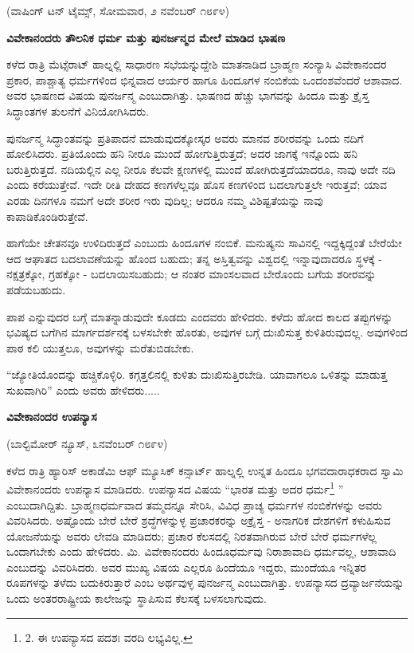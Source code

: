 \begin{center}
(ವಾಷಿಂಗ್ ಟನ್ ಟೈಮ್ಸ್, ಸೋಮವಾರ, ೨ ನವೆಂಬರ್ ೧೮೯೪)
\end{center}

\begin{center}
\textbf{ವಿವೇಕಾನಂದರು ತೌಲನಿಕ ಧರ್ಮ ಮತ್ತು ಪುನರ್ಜನ್ಮದ ಮೇಲೆ ಮಾಡಿದ ಭಾಷಣ}
\end{center}

ಕಳೆದ ರಾತ್ರಿ ಮೆಟ್ಸೆರಾಟ್ ಹಾಲ್ನಲ್ಲಿ ಸಾಧಾರಣ ಸಭೆಯನ್ನುದ್ದೇಶಿ ಮಾತನಾಡಿದ ಬ್ರಾಹ್ಮಣ ಸಂನ್ಯಾಸಿ ವಿವೇಕಾನಂದರ ಪ್ರಕಾರ, ಪಾಶ್ಚಾತ್ಯ ಧರ್ಮಗಳಿಂದ ಭಿನ್ನವಾದ ಆರ್ಯರ ಹಾಗೂ ಹಿಂದೂಗಳ ನಂಬಿಕೆಯ ಒಂದಂಶವೆಂದರೆ ಆಶಾವಾದ. ಅವರ ಭಾಷಣದ ವಿಷಯ ಪುನರ್ಜನ್ಮ ಎಂಬುದಾಗಿತ್ತು. ಭಾಷಣದ ಹೆಚ್ಚು ಭಾಗವನ್ನು ಹಿಂದೂ ಮತ್ತು ಕ್ರೈಸ್ತ ಸಿದ್ಧಾಂತಗಳ ತುಲನೆಗೆ ವಿನಿಯೋಗಿಸಿದರು.

ಪುನರ್ಜನ್ಮ ಸಿದ್ಧಾಂತವನ್ನು ಪ್ರತಿಪಾದನೆ ಮಾಡುವುದಕ್ಕೋಸ್ಕರ ಅವರು ಮಾನವ ಶರೀರವನ್ನು ಒಂದು ನದಿಗೆ ಹೋಲಿಸಿದರು. ಪ್ರತಿಯೊಂದು ಹನಿ ನೀರೂ ಮುಂದೆ ಹೋಗುತ್ತಿರುತ್ತದೆ; ಅದರ ಜಾಗಕ್ಕೆ ಇನ್ನೊಂದು ಹನಿ ಬರುತ್ತಿರುತ್ತದೆ. ನದಿಯಲ್ಲಿನ ಎಲ್ಲ ನೀರೂ ಕೆಲವೇ ಕ್ಷಣಗಳಲ್ಲಿ ಮುಂದೆ ಹೋಗಿರುತ್ತದೆಯಾದರೂ, ನಾವು ಅದೇ ನದಿ ಎಂದು ಕರೆಯುತ್ತೇವೆ. ಇದೇ ರೀತಿ ದೇಹದ ಕಣಗಳೆಲ್ಲವೂ ಹೊಸ ಕಣಗಳಿಂದ ಬದಲಾಗುತ್ತಲೇ ಇರುತ್ತವೆ; ಯಾವ ಎರಡು ದಿನಗಳೂ ನಮಗೆ ಅದೇ ಶರೀರ ಇರು ವುದಿಲ್ಲ; ಆದರೂ ನಮ್ಮ ವಿಶಿಷ್ಟತೆಯನ್ನು ನಾವು ಕಾಪಾಡಿಕೊಂಡಿರುತ್ತೇವೆ.

ಹಾಗೆಯೇ ಚೇತನವೂ ಉಳಿದಿರುತ್ತದೆ ಎಂಬುದು ಹಿಂದೂಗಳ ನಂಬಿಕೆ. ಮನುಷ್ಯನು ಸಾವಿನಲ್ಲಿ ಇದ್ದಕ್ಕಿದ್ದಂತೆ ಬೇರೆಯೇ ಆದ ಆಘಾತದ ಬದಲಾವಣೆಯನ್ನು ಹೊಂದ ಬಹುದು; ತನ್ನ ಅಸ್ತಿತ್ವವನ್ನು ವಿಶ್ವದಲ್ಲಿ ಇನ್ನಾವುದಾದರೂ ಸ್ಥಳಕ್ಕೆ - ನಕ್ಷತ್ರಕ್ಕೋ, ಗ್ರಹಕ್ಕೋ - ಬದಲಾಯಿಸಬಹುದು; ಆ ನಂತರ ಮಾಂಸಲವಾದ ಬೇರೊಂದು ಬಗೆಯ ಶರೀರವನ್ನು ಪಡೆಯಬಹುದು.

ಪಾಪ ಎನ್ನುವುದರ ಬಗ್ಗೆ ಮಾತನ್ನಾಡುವುದೇ ಕೂಡದು ಎಂದವರು ಹೇಳಿದರು. ಕಳೆದು ಹೋದ ಕಾಲದ ತಪ್ಪುಗಳನ್ನು ಭವಿಷ್ಯದ ಬಗೆಗಿನ ಮಾರ್ಗದರ್ಶನಕ್ಕೆ ಬಳಸಬೇಕೇ ಹೊರತು, ಅವುಗಳ ಬಗ್ಗೆ ದುಃಖಿಸುತ್ತ ಕುಳಿತಿರುವುದಲ್ಲ. ಅವುಗಳಿಂದ ಪಾಠ ಕಲಿ ಯುತ್ತಲೂ, ಅವುಗಳನ್ನು ಮರೆತುಬಿಡಬೇಕು.

“ಜ್ಯೋತಿಯೊಂದನ್ನು ಹಚ್ಚಿಕೊಳ್ಳಿರಿ. ಕಗ್ಗತ್ತಲಿನಲ್ಲಿ ಕುಳಿತು ದುಃಖಿಸುತ್ತಿರಬೇಡಿ. ಯಾವಾಗಲೂ ಒಳಿತನ್ನು ಮಾಡುತ್ತ ಸುಖವಾಗಿರಿ” ಎಂದು ಅವರು ಹೇಳಿದರು.....

\begin{center}
\textbf{ವಿವೇಕಾನಂದರ ಉಪನ್ಯಾಸ}
\end{center}

\begin{center}
(ಬಾಲ್ಟಿಮೋರ್ ನ್ಯೂಸ್, ೩ನವೆಂಬರ್ ೧೮೯೪)
\end{center}

ಕಳೆದ ರಾತ್ರಿ ಹ್ಯಾರಿಸ್ ಅಕಾಡೆಮಿ ಆಫ್ ಮ್ಯೂಸಿಕ್ ಕನ್ಸಾರ್ಟ್ ಹಾಲ್ನಲ್ಲಿ ಉನ್ನತ ಹಿಂದೂ ಭಗವದಾರಾಧಕರಾದ ಸ್ವಾಮಿ ವಿವೇಕಾನಂದರು ಉಪನ್ಯಾಸ ಮಾಡಿದರು. ಉಪನ್ಯಾಸದ ವಿಷಯ “ಭಾರತ ಮತ್ತು ಅದರ ಧರ್ಮ\footnote{2. ಈ ಉಪನ್ಯಾಸದ ಪದಶಃ ವರದಿ ಲಭ್ಯವಿಲ್ಲ.} ” ಎಂಬುದಾಗಿದ್ದಿತು. ಬ್ರಾಹ್ಮಣಧರ್ಮವಾದ ತಮ್ಮದನ್ನೂ ಸೇರಿಸಿ, ವಿವಿಧ ಪ್ರಾಚ್ಯ ಧರ್ಮಗಳ ನಂಬಿಕೆಗಳನ್ನು ಅವರು ವಿವರಿಸಿದರು. ಅಷ್ಟೊಂದು ಬೇರೆ ಬೇರೆ ಶ್ರದ್ಧೆಗಳನ್ನುಳ್ಳ ಪ್ರಚಾರಕರನ್ನು ಅಕ್ರೈಸ್ತ - ಅನಾಗರಿಕ ದೇಶಗಳಿಗೆ ಕಳುಹಿಸುವ ಯೋಜನೆಯನ್ನು ಅವರು ಲೇವಡಿ ಮಾಡಿದರು; ಪ್ರಚಾರ ಕೆಲಸದಲ್ಲಿ ನಿರತವಾಗಿರುವ ಬೇರೆ ಬೇರೆ ಧರ್ಮಗಳೆಲ್ಲ ಒಂದಾಗಬೇಕು ಎಂದು ಹೇಳಿದರು. ಮಿ. ವಿವೇಕಾನಂದರು ಹಿಂದೂಧರ್ಮವು ನಿರಾಶಾವಾದಿ ಧರ್ಮವಲ್ಲ, ಆಶಾವಾದಿ ಎಂಬುದನ್ನು ವಿವರಿಸಿದರು. ಅವರ ಮುಖ್ಯ ವಿಷಯ ಎಲ್ಲರೂ ಹಿಂದೆಯೂ ಇದ್ದರು, ಮುಂದೆಯೂ ಇನ್ನಿತರ ರೂಪಗಳನ್ನು ತಳೆದು ಬದುಕಿರುತ್ತಾರೆ ಎಂಬ ಅರ್ಥವುಳ್ಳ ಪುನರ್ಜನ್ಮ ಎಂಬುದಾಗಿತ್ತು. ಉಪನ್ಯಾಸದ ದ್ರವ್ಯಾರ್ಜನೆಯನ್ನು ಒಂದು ಅಂತರರಾಷ್ಟ್ರೀಯ ಕಾಲೇಜನ್ನು ಸ್ಥಾಪಿಸುವ ಕೆಲಸಕ್ಕೆ ಬಳಸಲಾಗುವುದು.

